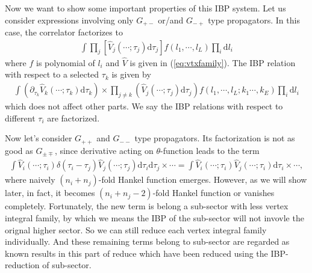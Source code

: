 \documentclass[a4paper,11pt]{article}
\newcommand{\nd}{\mathrm{d}}
\def\eqref#1{(\ref{#1})}
\begin{document}
Now we want to show some important properties of this IBP system. Let us consider expressions involving only  $G_{+-}$ or/and $G_{-+}$ type propagators. In this case, the correlator factorizes to 
\begin{align}
\int \prod_j \left[\hat{V}_j(\cdots;\tau_j) \nd \tau_j\right]  f(l_1,\cdots,l_L) \prod_i\nd l_i
\end{align}
where $f$ is polynomial of $l_i$ and $\hat{V}$ is given in \eqref{eq:vtxfamily}.
The IBP relation with respect to a selected $\tau_k$ is given by
\begin{align}
\int \left(\partial_{\tau_k} \hat{V}_k(\cdots;\tau_k) \nd \tau_k\right)  \times \prod_{j\neq k} \left(\hat{V}_j(\cdots;\tau_j) \nd \tau_j\right)  f(l_1,\cdots,l_L;k_1\cdots,k_E) \prod_i\nd l_i
\end{align}
which does not affect other parts. We say the IBP relations with respect to different $\tau_i$ are factorized.  

Now let's consider $G_{++}$ and $G_{--}$ type propagators. Its factorization is not as good as $G_{\pm \mp}$, since derivative acting on $\theta$-function leads to  the term
\begin{align}
\int  \hat{V}_i(\cdots;\tau_i) \delta(\tau_i-\tau_j) \hat{V}_j(\cdots;\tau_j)  \nd \tau_i\nd\tau_j\times \cdots = \int  \hat{V}_i(\cdots;\tau_i)\hat{V}_j(\cdots;\tau_i) \nd\tau_i\times\cdots, \label{eq:dtheta0}
\end{align}
where naively $(n_i+n_j)$-fold Hankel function emerges. However, as we will show later, in fact,
it becomes $(n_i+n_j-2)$-fold Hankel function or vanishes completely. Fortunately, the new term is belong a sub-sector with less vertex integral family, by which we means the IBP of the sub-sector will not invovle the orignal higher sector. So we can still reduce each vertex integral family individually. And these remaining terms belong to sub-sector are regarded as known results in this part of reduce which have been reduced using the IBP-reduction of sub-sector.
\end{document}
